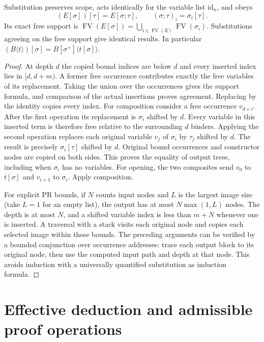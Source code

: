\begin{theorem}\label{thm:subst}
Substitution preserves scope, acts identically for the variable list
$\mathrm{id}_n$, and obeys
\[
  (E[\sigma])[\tau]=E[\sigma;\tau],\qquad
  (\sigma;\tau)_i=\sigma_i[\tau].
\]
Its exact free support is
$\operatorname{FV}(E[\sigma])
 =\bigcup_{i\in\operatorname{FV}(E)}\operatorname{FV}(\sigma_i)$.
Substitutions agreeing on the free support give identical results.
In particular
$(B\langle t\rangle)[\sigma]=B[\sigma^+]\langle t[\sigma]\rangle$.
\end{theorem}
\begin{proof}
At depth $d$ the copied bound indices are below $d$ and every inserted
index lies in $[d,d+m)$. A former free occurrence contributes exactly
the free variables of its replacement. Taking the union over the
occurrences gives the support formula, and comparison of the actual
insertions proves agreement. Replacing by the identity copies every
index. For composition consider a free occurrence $v_{d+i}$. After
the first operation its replacement is $\sigma_i$ shifted by $d$.
Every variable in this inserted term is therefore free relative to
the surrounding $d$ binders. Applying the second operation replaces
each original variable $v_j$ of $\sigma_i$ by $\tau_j$ shifted
by $d$. The result is precisely $\sigma_i[\tau]$ shifted by $d$.
Original bound occurrences and constructor nodes are copied on both
sides. This proves the equality of output trees, including when
$\sigma_i$ has no variables. For opening, the two composites send
$v_0$ to $t[\sigma]$ and $v_{i+1}$ to $\sigma_i$. Apply composition.

For explicit PR bounds, if $N$ counts input nodes and $L$ is the
largest image size (take $L=1$ for an empty list), the output has at
most $N\max(1,L)$ nodes. The depth is at most $N$, and a shifted
variable index is less than $m+N$ whenever one is inserted. A traversal
with a stack visits each original node and copies each selected image
within these bounds. The preceding arguments can be verified by a
bounded conjunction over occurrence addresses: trace each output block
to its original node, then use the computed input path and depth at that
node. This avoids induction with a universally quantified substitution
as induction formula.
\end{proof}

\section{Effective deduction and admissible proof operations}\label{sec:deduction}

